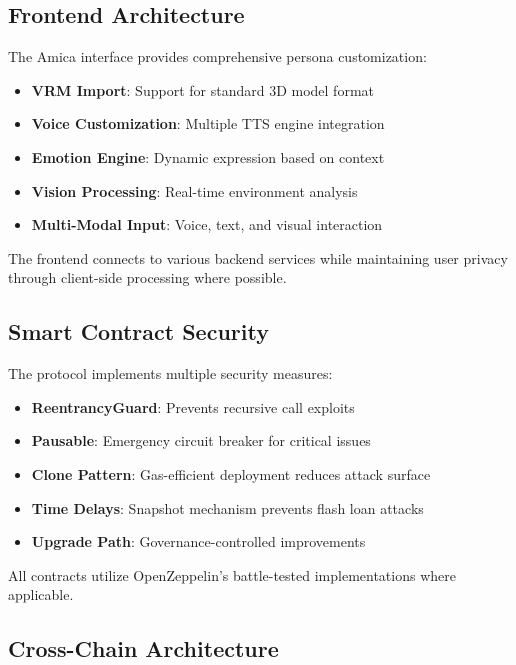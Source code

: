 \documentclass{article}
\begin{document}
\subsection{Frontend Architecture}

The Amica interface provides comprehensive persona customization:

\begin{itemize}
    \item \textbf{VRM Import}: Support for standard 3D model format
    \item \textbf{Voice Customization}: Multiple TTS engine integration
    \item \textbf{Emotion Engine}: Dynamic expression based on context
    \item \textbf{Vision Processing}: Real-time environment analysis
    \item \textbf{Multi-Modal Input}: Voice, text, and visual interaction
\end{itemize}

The frontend connects to various backend services while maintaining user privacy through client-side processing where possible.

\subsection{Smart Contract Security}

The protocol implements multiple security measures:

\begin{itemize}
    \item \textbf{ReentrancyGuard}: Prevents recursive call exploits
    \item \textbf{Pausable}: Emergency circuit breaker for critical issues
    \item \textbf{Clone Pattern}: Gas-efficient deployment reduces attack surface
    \item \textbf{Time Delays}: Snapshot mechanism prevents flash loan attacks
    \item \textbf{Upgrade Path}: Governance-controlled improvements
\end{itemize}

All contracts utilize OpenZeppelin's battle-tested implementations where applicable.

\subsection{Cross-Chain Architecture}
\end{document}
